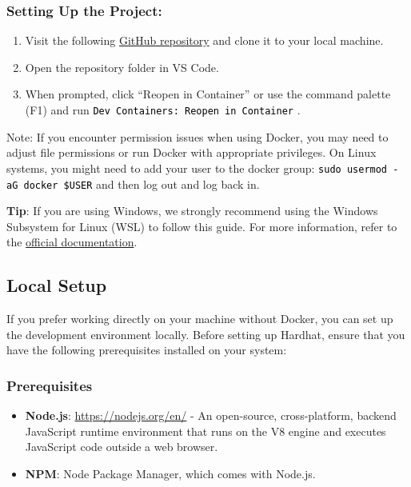 \documentclass[12pt]{article}
\newcommand{\codegrey}[1]{%
  \texttt{\colorbox{black!4}{\textcolor{black}{#1}}}%
}
\begin{document}
\subsubsection*{Setting Up the Project:}

\begin{enumerate}
    \item Visit the following
          \href{https://github.com/radovluk/Smart-Contract-Exercise/tree/main/01-Hello-Blockchain-World/task/task-code}{GitHub repository} and clone it to your local machine.
    \item Open the repository folder in VS Code.
    \item When prompted, click ``Reopen in Container'' or use the command palette (F1)
          and run \codegrey{Dev Containers: Reopen in Container}.
\end{enumerate}

\noindent
Note: If you encounter permission issues when using Docker, you may need to adjust file permissions or run Docker with appropriate privileges. On Linux systems, you might need to add your user to the docker group: \codegrey{sudo usermod -aG docker \$USER} and then log out and log back in.

\medskip
\noindent
\textbf{Tip}: If you are using Windows, we strongly recommend using the Windows Subsystem for Linux (WSL) to follow this guide. For more information, refer to the \href{https://learn.microsoft.com/en-us/windows/wsl/about}{official documentation}.

\subsection{Local Setup}

If you prefer working directly on your machine without Docker, you can set up
the development environment locally. Before setting up Hardhat, ensure that you
have the following prerequisites installed on your system:

\subsubsection*{Prerequisites}
\begin{itemize}
    \item \textbf{Node.js}: \url{https://nodejs.org/en/} - An open-source, cross-platform, backend JavaScript runtime environment that runs on the V8 engine and executes JavaScript code outside a web browser.
    \item \textbf{NPM}: Node Package Manager, which comes with Node.js.
\end{itemize}
\end{document}
